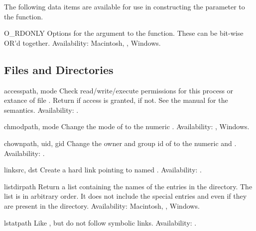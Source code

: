 The following data items are available for use in constructing the
 parameter to the  function.

\begin{datadesc}{O_RDONLY}
Options for the  argument to the  function.
These can be bit-wise OR'd together.
Availability: Macintosh, \UNIX{}, Windows.
\end{datadesc}


\subsection{Files and Directories \label{os-file-dir}}

\begin{funcdesc}{access}{path, mode}
Check read/write/execute permissions for this process or extance of file
.  Return  if access is granted,  if not.
See the \UNIX{} manual for the semantics.
Availability: \UNIX{}.
\end{funcdesc}

\begin{funcdesc}{chmod}{path, mode}
Change the mode of  to the numeric .
Availability: \UNIX{}, Windows.
\end{funcdesc}

\begin{funcdesc}{chown}{path, uid, gid}
Change the owner and group id of  to the numeric 
and .
Availability: \UNIX{}.
\end{funcdesc}

\begin{funcdesc}{link}{src, dst}
Create a hard link pointing to  named .
Availability: \UNIX{}.
\end{funcdesc}

\begin{funcdesc}{listdir}{path}
Return a list containing the names of the entries in the directory.
The list is in arbitrary order.  It does not include the special
entries  and  even if they are present in the
directory.
Availability: Macintosh, \UNIX{}, Windows.
\end{funcdesc}

\begin{funcdesc}{lstat}{path}
Like , but do not follow symbolic links.
Availability: \UNIX{}.
\end{funcdesc}

